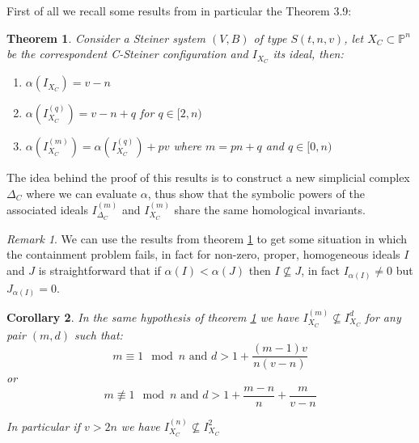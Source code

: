\documentclass[notitlepage, a4]{book}
\theoremstyle{plain}
\newtheorem{teo}{Theorem}[section]
\newtheorem{cor}[teo]{Corollary}
\theoremstyle{remark}
\newtheorem{rem}{Remark}
\theoremstyle{definition}
\newcommand{\PP}{\mathbb{P}}
\begin{document}
 First of all we recall some results from \cite{Bal20Steiner} in particular the Theorem 3.9:
 
 \begin{teo} \label{teo:alphaXC}
Consider a Steiner system $ (V,B) $ of type $ S(t,n,v) $, let $ X_C \subset \PP^n$ be the correspondent C-Steiner configuration and $ I_{X_C} $ its ideal, then:
\begin{enumerate}
\item $ \alpha(I_{X_C}) = v- n $
\item $ \alpha(I_{X_C}^{(q)}) = v- n +q  $ for $ q \in [2,n) $
\item $ \alpha(I_{X_C}^{(m)}) = \alpha(I_{X_C}^{(q)}) + pv $ where $ m=pn + q $ and $ q \in [0,n) $
\end{enumerate}
 \end{teo}
 
 The idea behind the proof of this results is to construct a new simplicial complex $ \Delta_C $ where we can evaluate $\alpha$, thus show that the symbolic powers of the associated ideals $ I_{\Delta_C}^{(m)} $ and $ I_{X_C}^{(m)} $ share the same homological invariants. 
 
 
  
\begin{rem}\label{rem:alphaXC}
We can use the results from theorem \ref{teo:alphaXC} to get some situation in which the containment problem fails, in fact for non-zero, proper, homogeneous ideals $ I $ and $ J $ is straightforward that if $ \alpha(I) < \alpha(J) $ then $ I \not\subseteq J $, in fact $ I_{ \alpha(I) } \neq 0$ but $ J_{ \alpha(I) } = 0 $. 
\end{rem}

\begin{cor}\label{cor:alphaXC}
In the same hypothesis of theorem \ref{teo:alphaXC} we have $ I_{X_C}^{(m)} \not \subseteq I_{X_C}^d $ for any pair $ (m,d) $ such that:
\begin{equation}\label{eq:cor:alphaXC:1}
	m \equiv 1 \mod n \text{ and } d > 1 + \frac{ (m-1)v }{ n(v-n)}
\end{equation}
or 
\begin{equation}\label{eq:cor:alphaXC:2}
	m \not \equiv 1 \mod n \text{ and } d > 1  + \frac{ m - n }{ n } + \frac{ m }{ v - n }
\end{equation}

 In particular if $ v > 2n $ we have $ I_{X_C}^{(n)} \not \subseteq I_{X_C}^2  $
 \end{cor}
  
\end{document}
